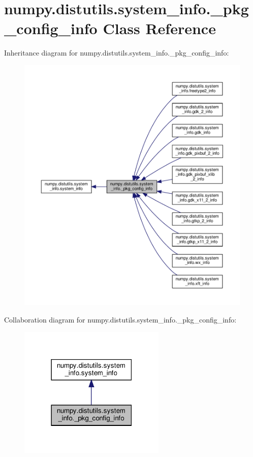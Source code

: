 \hypertarget{classnumpy_1_1distutils_1_1system__info_1_1__pkg__config__info}{}\section{numpy.\+distutils.\+system\+\_\+info.\+\_\+pkg\+\_\+config\+\_\+info Class Reference}
\label{classnumpy_1_1distutils_1_1system__info_1_1__pkg__config__info}


Inheritance diagram for numpy.\+distutils.\+system\+\_\+info.\+\_\+pkg\+\_\+config\+\_\+info\+:
\nopagebreak
\begin{figure}[H]
\begin{center}
\leavevmode
\includegraphics[width=350pt]{classnumpy_1_1distutils_1_1system__info_1_1__pkg__config__info__inherit__graph}
\end{center}
\end{figure}


Collaboration diagram for numpy.\+distutils.\+system\+\_\+info.\+\_\+pkg\+\_\+config\+\_\+info\+:
\nopagebreak
\begin{figure}[H]
\begin{center}
\leavevmode
\includegraphics[width=198pt]{classnumpy_1_1distutils_1_1system__info_1_1__pkg__config__info__coll__graph}
\end{center}
\end{figure}
